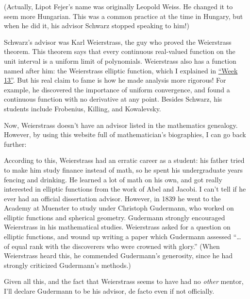 \documentclass{article}
\def\tightlist{}
\renewcommand{\texttt}[1]{%
  \begingroup
  \ttfamily
  \begingroup\lccode`~=`/\lowercase{\endgroup\def~}{/\discretionary{}{}{}}%
  \begingroup\lccode`~=`[\lowercase{\endgroup\def~}{[\discretionary{}{}{}}%
  \begingroup\lccode`~=`.\lowercase{\endgroup\def~}{.\discretionary{}{}{}}%
  \catcode`/=\active\catcode`[=\active\catcode`.=\active
  \scantokens{#1\noexpand}%
  \endgroup
}
\begin{document}
(Actually, Lipot Fejer's name was originally Leopold Weiss. He changed
it to seem more Hungarian. This was a common practice at the time in
Hungary, but when he did it, his advisor Schwarz stopped speaking to
him!)

Schwarz's advisor was Karl Weierstrass, the guy who proved the
Weierstrass theorem. This theorem says that every continuous real-valued
function on the unit interval is a uniform limit of polynomials.
Weierstrass also has a function named after him: the Weierstrass
elliptic function, which I explained in
\protect\hyperlink{week13}{``Week 13''}. But his real claim to fame is
how he made analysis more rigorous! For example, he discovered the
importance of uniform convergence, and found a continuous function with
no derivative at any point. Besides Schwarz, his students include
Frobenius, Killing, and Kowalevsky.

Now, Weierstrass doesn't have an advisor listed in the mathematics
genealogy. However, by using this website full of mathematician's
biographies, I can go back further:


According to this, Weierstrass had an erratic career as a student: his
father tried to make him study finance instead of math, so he spent his
undergraduate years fencing and drinking. He learned a lot of math on
his own, and got really interested in elliptic functions from the work
of Abel and Jacobi. I can't tell if he ever had an official dissertation
advisor. However, in 1839 he went to the Academy at Muenster to study
under Christoph Gudermann, who worked on elliptic functions and
spherical geometry. Gudermann strongly encouraged Weierstrass in his
mathematical studies. Weierstrass asked for a question on elliptic
functions, and wound up writing a paper which Gudermann assessed
``\ldots{} of equal rank with the discoverers who were crowned with
glory.'' (When Weierstrass heard this, he commended Gudermann's
generosity, since he had strongly criticized Gudermann's methods.)

Given all this, and the fact that Weierstrass seems to have had no
\emph{other} mentor, I'll declare Gudermann to be his advisor, de facto
even if not officially.
\end{document}
